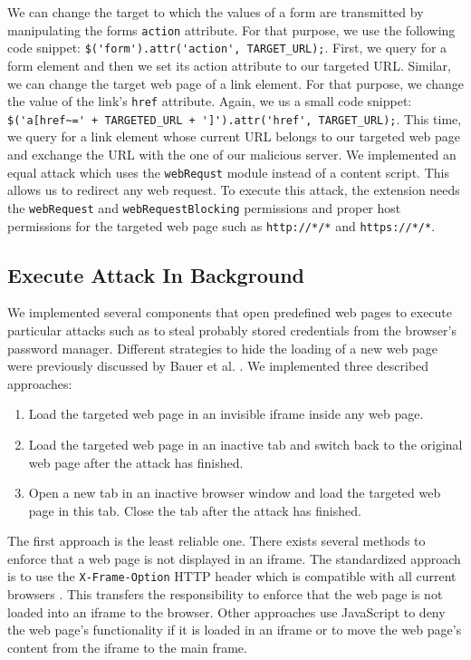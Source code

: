 	We can change the target to which the values of a form are transmitted by manipulating the forms \texttt{action} attribute. For that purpose, we use the following code snippet: \lstinline|$('form').attr('action', TARGET_URL);|. First, we query for a form element and then we set its action attribute to our targeted URL. Similar, we can change the target web page of a link element. For that purpose, we change the value of the link's \texttt{href} attribute. Again, we us a small code snippet: \lstinline|$('a[href~=' + TARGETED_URL + ']').attr('href', TARGET_URL);|. This time, we query for a link element whose current URL belongs to our targeted web page and exchange the URL with the one of our malicious server. We implemented an equal attack which uses the \texttt{webRequst} module instead of a content script. This allows us to redirect any web request. To execute this attack, the extension needs the \texttt{webRequest} and \texttt{webRequestBlocking} permissions and proper host permissions for the targeted web page such as \texttt{http://*/*} and \texttt{https://*/*}. 
	
	
\subsection{Execute Attack In Background}
\label{sec:executeAttackInBackground}

	We implemented several components that open predefined web pages to execute particular attacks such as to steal probably stored credentials from the browser's password manager. Different strategies to hide the loading of a new web page were previously discussed by Bauer et al. \cite{extensions:cns14}. We implemented three described approaches:
	
	\begin{enumerate}
		\item Load the targeted web page in an invisible iframe inside any web page.
		\item Load the targeted web page in an inactive tab and switch back to the original web page after the attack has finished.
		\item Open a new tab in an inactive browser window and load the targeted web page in this tab. Close the tab after the attack has finished.
	\end{enumerate} 
	
	The first approach is the least reliable one. There exists several methods to enforce that a web page is not displayed in an iframe. The standardized approach is to use the \texttt{X-Frame-Option} HTTP header which is compatible with all current browsers \cite{xFrameOptionsSpezification, xFrameOptionsCompability}. This transfers the responsibility to enforce that the web page is not loaded into an iframe to the browser. Other approaches use JavaScript to deny the web page's functionality if it is loaded in an iframe or to move the web page's content from the iframe to the main frame.
		
